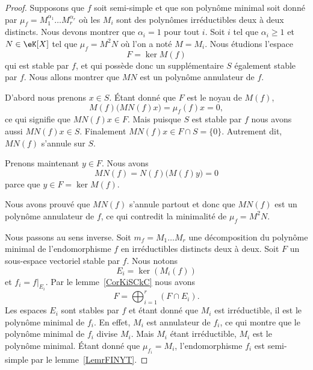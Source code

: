 \begin{proof}

    Supposons que \( f\) soit semi-simple et que son polynôme minimal soit donné par \( \mu_f=M_1^{\alpha_1}\ldots M_r^{\alpha_r}\) où les \( M_i\) sont des polynômes irréductibles deux à deux distincts. Nous devons montrer que \( \alpha_i=1\) pour tout \( i\). Soit \( i\) tel que \( \alpha_i\geq 1\) et \( N\in \eK[X]\) tel que \( \mu_f=M^2N\) où l'on a noté \( M=M_i\). Nous étudions l'espace
    \begin{equation}
        F=\ker M(f)
    \end{equation}
    qui est stable par \( f\), et qui possède donc un supplémentaire \( S\) également stable par \( f\). Nous allons montrer que \( MN\) est un polynôme annulateur de \( f\).

    D'abord nous prenons \( x\in S\). Étant donné que \( F\) est le noyau de \( M(f)\),
    \begin{equation}
        M(f)\big( MN(f)x \big)=\mu_f(f)x=0,
    \end{equation}
    ce qui signifie que \( MN(f)x\in F\). Mais puisque \( S\) est stable par \( f\) nous avons aussi \( MN(f)x\in S\). Finalement \( MN(f)x\in F\cap S=\{ 0 \}\). Autrement dit, \( MN(f)\) s'annule sur \( S\).

    Prenons maintenant \( y\in F\). Nous avons
    \begin{equation}
        MN(f)=N(f)\big( M(f)y \big)=0
    \end{equation}
    parce que \( y\in F=\ker M(f)\).

    Nous avons prouvé que \( MN(f)\) s'annule partout et donc que \( MN(f)\) est un polynôme annulateur de \( f\), ce qui contredit la minimalité de \( \mu_f=M^2N\).

    Nous passons au sens inverse. Soit \( m_f=M_1\ldots M_r\) une décomposition du polynôme minimal de l'endomorphisme \( f\) en irréductibles distincts deux à deux. Soit \( F\) un sous-espace vectoriel stable par \( f\). Nous notons
    \begin{equation}
        E_i=\ker(M_i(f))
    \end{equation}
    et \( f_i=f|_{E_i}\). Par le lemme~\ref{CorKiSCkC} nous avons
    \begin{equation}
        F=\bigoplus_{i=1}^r(F\cap E_i).
    \end{equation}
    Les espaces \( E_i\) sont stables par \( f\) et étant donné que \( M_i\) est irréductible, il est le polynôme minimal de \( f_i\). En effet, \( M_i\) est annulateur de \( f_i\), ce qui montre que le polynôme minimal de \( f_i\) divise \( M_i\). Mais \( M_i\) étant irréductible, \( M_i\) est le polynôme minimal. Étant donné que \( \mu_{f_i}=M_i\), l'endomorphisme \( f_i\) est semi-simple par le lemme~\ref{LemrFINYT}.


\end{proof}
